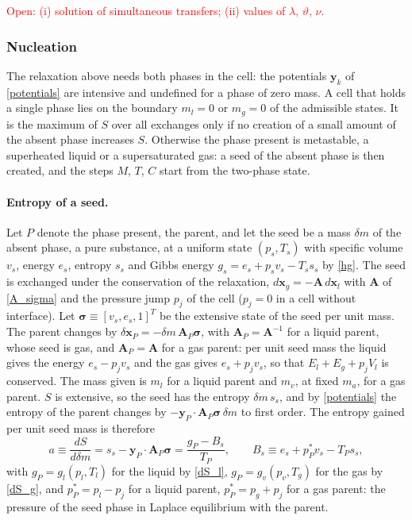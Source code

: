 \textcolor{red}{Open: (i) solution of simultaneous transfers; (ii) values of $\lambda$, $\vartheta$, $\nu$.}

\subsubsection{Nucleation}\label{sec_nuc}
The relaxation above needs both phases in the cell: the potentials $\boldsymbol{y}_k$ of \eqref{potentials} are intensive and undefined for a phase of zero mass. A cell that holds a single phase lies on the boundary $m_l=0$ or $m_g=0$ of the admissible states. It is the maximum of $S$ over all exchanges only if no creation of a small amount of the absent phase increases $S$. Otherwise the phase present is metastable, a superheated liquid or a supersaturated gas: a seed of the absent phase is then created, and the steps $M$, $T$, $C$ start from the two-phase state.

\paragraph{Entropy of a seed.}
Let $P$ denote the phase present, the parent, and let the seed be a mass $\delta m$ of the absent phase, a pure substance, at a uniform state $(p_s,T_s)$ with specific volume $v_s$, energy $e_s$, entropy $s_s$ and Gibbs energy $g_s=e_s+p_sv_s-T_ss_s$ by \eqref{hg}. The seed is exchanged under the conservation of the relaxation, $d\boldsymbol{x}_g=-\boldsymbol{A}\,d\boldsymbol{x}_l$ with $\boldsymbol{A}$ of \eqref{A_sigma} and the pressure jump $p_{j}$ of the cell ($p_{j}=0$ in a cell without interface). Let $\boldsymbol{\sigma}\equiv[v_s,e_s,1]^T$ be the extensive state of the seed per unit mass. The parent changes by $\delta\boldsymbol{x}_P=-\delta m\,\boldsymbol{A}_P\boldsymbol{\sigma}$, with $\boldsymbol{A}_P=\boldsymbol{A}^{-1}$ for a liquid parent, whose seed is gas, and $\boldsymbol{A}_P=\boldsymbol{A}$ for a gas parent: per unit seed mass the liquid gives the energy $e_s-p_{j}v_s$ and the gas gives $e_s+p_{j}v_s$, so that $E_l+E_g+p_{j}V_l$ is conserved. The mass given is $m_l$ for a liquid parent and $m_v$, at fixed $m_a$, for a gas parent. $S$ is extensive, so the seed has the entropy $\delta m\,s_s$, and by \eqref{potentials} the entropy of the parent changes by $-\boldsymbol{y}_P\cdot\boldsymbol{A}_P\boldsymbol{\sigma}\,\delta m$ to first order. The entropy gained per unit seed mass is therefore
\begin{equation}\label{nuc_a}
a\equiv\frac{dS}{d\delta m}=s_s-\boldsymbol{y}_P\cdot\boldsymbol{A}_P\boldsymbol{\sigma}=\frac{g_P-B_s}{T_P},\qquad B_s\equiv e_s+p_P^*v_s-T_Ps_s,
\end{equation}
with $g_P=g_l(p_l,T_l)$ for the liquid by \eqref{dS_l}, $g_P=g_v(p_v,T_g)$ for the gas by \eqref{dS_g}, and $p_P^*=p_l-p_{j}$ for a liquid parent, $p_P^*=p_g+p_{j}$ for a gas parent: the pressure of the seed phase in Laplace equilibrium with the parent.

